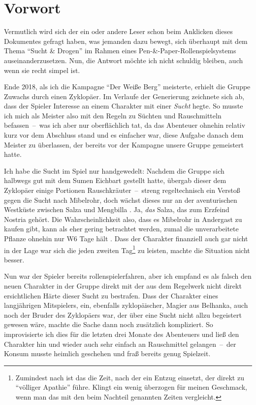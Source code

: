 \section*{Vorwort}
Vermutlich wird sich der ein oder andere Leser schon beim Anklicken dieses Dokumentes gefragt haben, was jemanden dazu bewegt, sich überhaupt mit dem Thema \enquote{Sucht \& Drogen} im Rahmen eines Pen-\&-Paper-Rollenspielsystems auseinanderzusetzen. Nun, die Antwort möchte ich nicht schuldig bleiben, auch wenn sie recht simpel ist.

Ende 2018, als ich die Kampagne \enquote{Der Weiße Berg} \cite{WB1,WB2} meisterte, erhielt die Gruppe Zuwachs durch einen Zyklopäer. Im Verlaufe der Generierung zeichnete sich ab, dass der Spieler Interesse an einem Charakter mit einer \emph{Sucht} hegte. So musste ich mich als Meister also mit den Regeln zu Süchten und Rauschmitteln befassen~--~was ich aber nur oberflächlich tat, da das Abenteuer ohnehin relativ kurz vor dem Abschluss stand und es einfacher war, diese Aufgabe danach dem Meister zu überlassen, der bereits vor der Kampagne unsere Gruppe gemeistert hatte.

Ich habe die Sucht im Spiel nur handgewedelt: Nachdem die Gruppe sich halbwegs gut mit dem Sumen Eichbart gestellt hatte, übergab dieser dem Zyklopäer einige Portionen Rauschkräuter~--~streng regeltechnisch ein Verstoß gegen die Sucht nach Mibelrohr, doch wächst dieses nur an der aventurischen Westküste zwischen Salza und Mengbilla \cite[S.~251]{ZBA}. Ja, \emph{das} Salza, das zum Erzfeind Nostria gehört. Die Wahrscheinlichkeit also, dass es Mibelrohr in Andergast zu kaufen gibt, kann als eher gering betrachtet werden, zumal die unverarbeitete Pflanze ohnehin nur W6 Tage hält \cite[S.~251]{ZBA}. Dass der Charakter finanziell auch gar nicht in der Lage war sich die  jeden zweiten Tag\footnote{Zumindest nach  ist das die Zeit, nach der ein Entzug einsetzt, der direkt zu \enquote{völliger Apathie} führe. Klingt ein wenig überzogen für meinen Geschmack, wenn man das mit den beim Nachteil genannten Zeiten vergleicht.} zu leisten, machte die Situation nicht besser.

Nun war der Spieler bereits rollenspielerfahren, aber ich empfand es als falsch den neuen Charakter in der Gruppe direkt mit der aus dem Regelwerk nicht direkt ersichtlichen Härte dieser Sucht zu bestrafen. Dass der Charakter eines langjährigen Mitspielers, ein, ebenfalls zyklopäischer, Magier aus Belhanka, auch noch der Bruder des Zyklopäers war, der über eine Sucht nicht allzu begeistert gewesen wäre, machte die Sache dann noch zusätzlich kompliziert. So improvisierte ich dies für die letzten drei Monate des Abenteuers und ließ den Charakter hin und wieder auch sehr einfach an Rauschmittel gelangen~--~der Konsum musste heimlich geschehen und fraß bereits genug Spielzeit.

